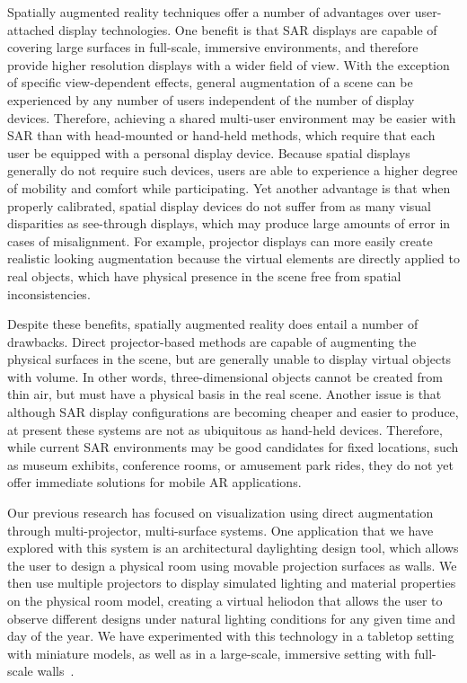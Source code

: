 \documentclass{thesis}
\begin{document}
Spatially augmented reality techniques offer a number of advantages over user-attached display technologies. One benefit is that SAR displays are capable of covering large surfaces in full-scale, immersive environments, and therefore provide higher resolution displays with a wider field of view. With the exception of specific view-dependent effects, general augmentation of a scene can be experienced by any number of users independent of the number of display devices. Therefore, achieving a shared multi-user environment may be easier with SAR than with head-mounted or hand-held methods, which require that each user be equipped with a personal display device. Because spatial displays generally do not require such devices, users are able to experience a higher degree of mobility and comfort while participating. Yet another advantage is that when properly calibrated, spatial display devices do not suffer from as many visual disparities as see-through displays, which may produce large amounts of error in cases of misalignment. For example, projector displays can more easily create realistic looking augmentation because the virtual elements are directly applied to real objects, which have physical presence in the scene free from spatial inconsistencies.

Despite these benefits, spatially augmented reality does entail a number of drawbacks. Direct projector-based methods are capable of augmenting the physical surfaces in the scene, but are generally unable to display virtual objects with volume. In other words, three-dimensional objects cannot be created from thin air, but must have a physical basis in the real scene. Another issue is that although SAR display configurations are becoming cheaper and easier to produce, at present these systems are not as ubiquitous as hand-held devices. Therefore, while current SAR environments may be good candidates for fixed locations, such as museum exhibits, conference rooms, or amusement park rides, they do not yet offer immediate solutions for mobile AR applications.

Our previous research has focused on visualization using direct augmentation through multi-projector, multi-surface systems. One application that we have explored with this system is an architectural daylighting design tool, which allows the user to design a physical room using movable projection surfaces as walls. We then use multiple projectors to display simulated lighting and material properties on the physical room model, creating a virtual heliodon that allows the user to observe different designs under natural lighting conditions for any given time and day of the year. We have experimented with this technology in a tabletop setting with miniature models, as well as in a large-scale, immersive setting with full-scale walls~\cite{Sheng2009, Yapo2010}.
\end{document}
